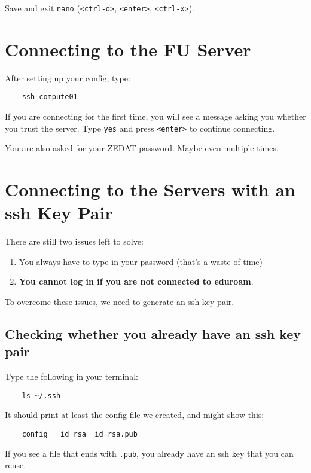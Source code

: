 \documentclass{article}
\begin{document}
Save and exit \verb|nano| (\texttt{<ctrl-o>}, \texttt{<enter>}, \texttt{<ctrl-x>}).

\section{Connecting to the FU Server}

After setting up your config, type:

\begin{verbatim}
    ssh compute01
\end{verbatim}

If you are connecting for the first time, you will see a message asking you whether you trust the server. Type \texttt{yes} and press \texttt{<enter>} to continue connecting.

You are also asked for your ZEDAT password. Maybe even multiple times.

\section{Connecting to the Servers with an ssh Key Pair}

There are still two issues left to solve:

\begin{enumerate}
    \item You always have to type in your password (that's a waste of time)
    \item \textbf{You cannot log in if you are not connected to eduroam}.
\end{enumerate}

To overcome these issues, we need to generate an ssh key pair.

\subsection{Checking whether you already have an ssh key pair}

Type the following in your terminal:

\begin{verbatim}
    ls ~/.ssh
\end{verbatim}

It should print at least the config file we created, and might show this:

\begin{verbatim}
    config   id_rsa  id_rsa.pub
\end{verbatim}

If you see a file that ends with \verb|.pub|, you already have an ssh key that you can reuse.
\end{document}
